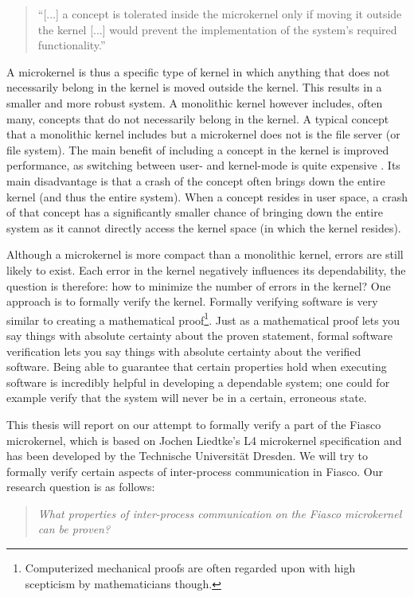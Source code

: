 \begin{quote}
``[...] a concept is tolerated inside the microkernel only if moving it outside the kernel [...] would prevent the implementation of the system's required functionality.''
\end{quote}

A microkernel is thus a specific type of kernel in which anything that does not necessarily belong in the kernel is moved outside the kernel. This results in a smaller and more robust system. A monolithic kernel however includes, often many, concepts that do not necessarily belong in the kernel. A typical concept that a monolithic kernel includes but a microkernel does not is the file server (or file system). The main benefit of including a concept in the kernel is improved performance, as switching between user- and kernel-mode is quite expensive \cite{hartig97performance}. Its main disadvantage is that a crash of the concept often brings down the entire kernel (and thus the entire system). When a concept resides in user space, a crash of that concept has a significantly smaller chance of bringing down the entire system as it cannot directly access the kernel space (in which the kernel resides).\emptyline

Although a microkernel is more compact than a monolithic kernel, errors are still likely to exist. Each error in the kernel negatively influences its dependability, the question is therefore: how to minimize the number of errors in the kernel? One approach is to formally verify the kernel. Formally verifying software is very similar to creating a mathematical proof\footnote{Computerized mechanical proofs are often regarded upon with high scepticism by mathematicians though.}. Just as a mathematical proof lets you say things with absolute certainty about the proven statement, formal software verification lets you say things with absolute certainty about the verified software. Being able to guarantee that certain properties hold when executing software is incredibly helpful in developing a dependable system; one could for example verify that the system will never be in a certain, erroneous state.\emptyline

This thesis will report on our attempt to formally verify a part of the Fiasco microkernel, which is based on Jochen Liedtke's L4 microkernel specification \cite{liedtke96reference} and has been developed by the Technische Universit{\"a}t Dresden. We will try to formally verify certain aspects of inter-process communication in Fiasco. Our research question is as follows:
\begin{quote}
\textsl{What properties of inter-process communication on the Fiasco microkernel can be proven?}
\end{quote}

